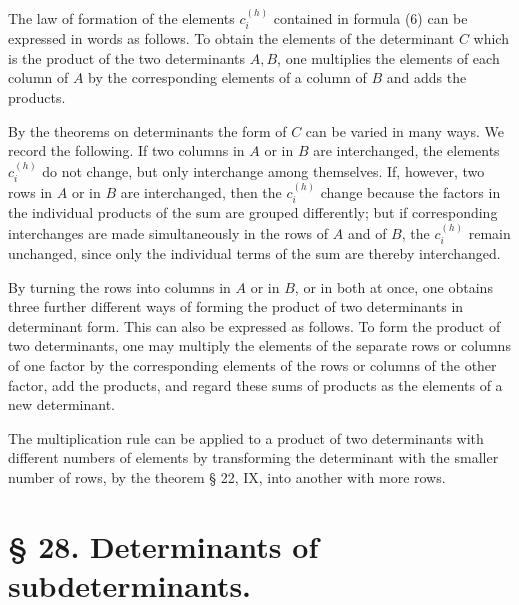 \documentclass[11pt]{article}
\begin{document}
The law of formation of the elements $c_i^{(h)}$ contained in formula (6) can be expressed in words as follows. To obtain the elements of the determinant $C$ which is the product of the two determinants $A,B$, one multiplies the elements of each column of $A$ by the corresponding elements of a column of $B$ and adds the products.

By the theorems on determinants the form of $C$ can be varied in many ways. We record the following. If two columns in $A$ or in $B$ are interchanged, the elements $c_i^{(h)}$ do not change, but only interchange among themselves. If, however, two rows in $A$ or in $B$ are interchanged, then the $c_i^{(h)}$ change because the factors in the individual products of the sum are grouped differently; but if corresponding interchanges are made simultaneously in the rows of $A$ and of $B$, the $c_i^{(h)}$ remain unchanged, since only the individual terms of the sum are thereby interchanged.

By turning the rows into columns in $A$ or in $B$, or in both at once, one obtains three further different ways of forming the product of two determinants in determinant form. This can also be expressed as follows. To form the product of two determinants, one may multiply the elements of the separate rows or columns of one factor by the corresponding elements of the rows or columns of the other factor, add the products, and regard these sums of products as the elements of a new determinant.

The multiplication rule can be applied to a product of two determinants with different numbers of elements by transforming the determinant with the smaller number of rows, by the theorem § 22, IX, into another with more rows.

\section*{§ 28. Determinants of subdeterminants.}
\end{document}
